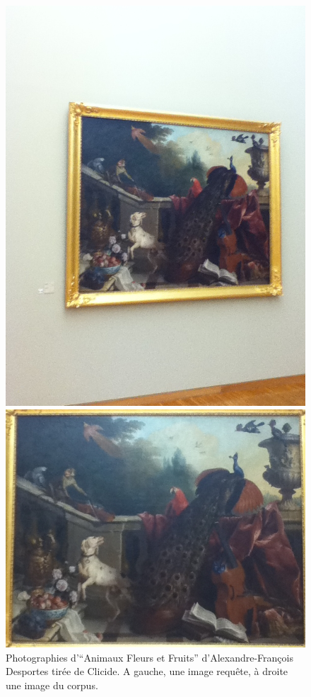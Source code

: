 \begin{figure}[htb]
\centering
    \begin{minipage}[c]{0.3\linewidth}
      \includegraphics[height=0.95\linewidth,angle=-90]{figures/12G-0428.JPG}
   \end{minipage} 
   \begin{minipage}[c]{0.3\linewidth}
      \includegraphics[width=0.95\linewidth]{figures/12G-12.JPG}
   \end{minipage}
    \caption{Photographies d'``Animaux Fleurs et Fruits'' d'Alexandre-François Desportes tirée de Clicide. A gauche, une image requête, à droite une image du corpus.}
 \label{fig:exempleRequeteClicide}
\end{figure}

